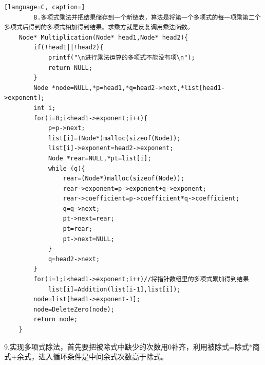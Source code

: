 \documentclass{ctexart}
\begin{document}
	\begin{lstlisting}[language=C, caption=]
		8.多项式乘法并把结果储存到一个新链表，算法是将第一个多项式的每一项乘第二个多项式后得到的多项式相加得到结果。求乘方就是反复调用乘法函数。
	Node* Multiplication(Node* head1,Node* head2){
		if(!head1||!head2){
			printf("\n进行乘法运算的多项式不能没有项\n");
			return NULL;
		}
		Node *node=NULL,*p=head1,*q=head2->next,*list[head1->exponent];
		int i;
		for(i=0;i<head1->exponent;i++){
			p=p->next;
			list[i]=(Node*)malloc(sizeof(Node));
			list[i]->exponent=head2->exponent;
			Node *rear=NULL,*pt=list[i];
			while (q){
				rear=(Node*)malloc(sizeof(Node));
				rear->exponent=p->exponent+q->exponent;
				rear->coefficient=p->coefficient*q->coefficient;
				q=q->next;
				pt->next=rear;
				pt=rear;
				pt->next=NULL;
			}
			q=head2->next;
		}
		for(i=1;i<head1->exponent;i++)//将指针数组里的多项式累加得到结果
			list[i]=Addition(list[i-1],list[i]);
		node=list[head1->exponent-1];
		node=DeleteZero(node);
		return node;
	}
	\end{lstlisting}
	9.实现多项式除法，首先要把被除式中缺少的次数用0补齐，利用被除式=除式*商式+余式，进入循环条件是中间余式次数高于除式。
\end{document}
